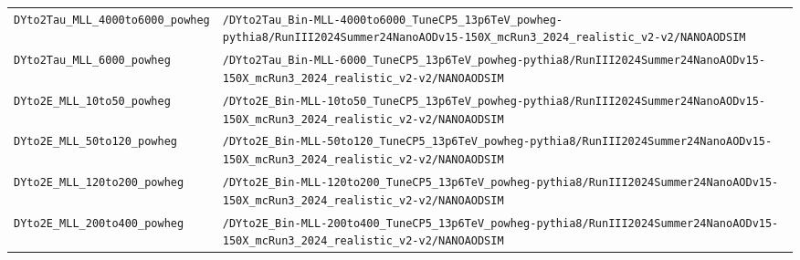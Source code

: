 \begin{longtable}{@{}>{\RaggedRight\arraybackslash}p{} >{\RaggedRight\arraybackslash}p{}@{}}
\addlinespace[2pt]
\texttt{DYto2Tau\_\allowbreak{}MLL\_\allowbreak{}4000to6000\_\allowbreak{}powheg} & \texttt{/\allowbreak{}DYto2Tau\_\allowbreak{}Bin-\allowbreak{}MLL-\allowbreak{}4000to6000\_\allowbreak{}TuneCP5\_\allowbreak{}13p6TeV\_\allowbreak{}powheg-\allowbreak{}pythia8/\allowbreak{}RunIII2024Summer24NanoAODv15-\allowbreak{}150X\_\allowbreak{}mcRun3\_\allowbreak{}2024\_\allowbreak{}realistic\_\allowbreak{}v2-\allowbreak{}v2/\allowbreak{}NANOAODSIM} \\
\addlinespace[2pt]
\texttt{DYto2Tau\_\allowbreak{}MLL\_\allowbreak{}6000\_\allowbreak{}powheg} & \texttt{/\allowbreak{}DYto2Tau\_\allowbreak{}Bin-\allowbreak{}MLL-\allowbreak{}6000\_\allowbreak{}TuneCP5\_\allowbreak{}13p6TeV\_\allowbreak{}powheg-\allowbreak{}pythia8/\allowbreak{}RunIII2024Summer24NanoAODv15-\allowbreak{}150X\_\allowbreak{}mcRun3\_\allowbreak{}2024\_\allowbreak{}realistic\_\allowbreak{}v2-\allowbreak{}v2/\allowbreak{}NANOAODSIM} \\
\addlinespace[2pt]
\texttt{DYto2E\_\allowbreak{}MLL\_\allowbreak{}10to50\_\allowbreak{}powheg} & \texttt{/\allowbreak{}DYto2E\_\allowbreak{}Bin-\allowbreak{}MLL-\allowbreak{}10to50\_\allowbreak{}TuneCP5\_\allowbreak{}13p6TeV\_\allowbreak{}powheg-\allowbreak{}pythia8/\allowbreak{}RunIII2024Summer24NanoAODv15-\allowbreak{}150X\_\allowbreak{}mcRun3\_\allowbreak{}2024\_\allowbreak{}realistic\_\allowbreak{}v2-\allowbreak{}v2/\allowbreak{}NANOAODSIM} \\
\addlinespace[2pt]
\texttt{DYto2E\_\allowbreak{}MLL\_\allowbreak{}50to120\_\allowbreak{}powheg} & \texttt{/\allowbreak{}DYto2E\_\allowbreak{}Bin-\allowbreak{}MLL-\allowbreak{}50to120\_\allowbreak{}TuneCP5\_\allowbreak{}13p6TeV\_\allowbreak{}powheg-\allowbreak{}pythia8/\allowbreak{}RunIII2024Summer24NanoAODv15-\allowbreak{}150X\_\allowbreak{}mcRun3\_\allowbreak{}2024\_\allowbreak{}realistic\_\allowbreak{}v2-\allowbreak{}v2/\allowbreak{}NANOAODSIM} \\
\addlinespace[2pt]
\texttt{DYto2E\_\allowbreak{}MLL\_\allowbreak{}120to200\_\allowbreak{}powheg} & \texttt{/\allowbreak{}DYto2E\_\allowbreak{}Bin-\allowbreak{}MLL-\allowbreak{}120to200\_\allowbreak{}TuneCP5\_\allowbreak{}13p6TeV\_\allowbreak{}powheg-\allowbreak{}pythia8/\allowbreak{}RunIII2024Summer24NanoAODv15-\allowbreak{}150X\_\allowbreak{}mcRun3\_\allowbreak{}2024\_\allowbreak{}realistic\_\allowbreak{}v2-\allowbreak{}v2/\allowbreak{}NANOAODSIM} \\
\addlinespace[2pt]
\texttt{DYto2E\_\allowbreak{}MLL\_\allowbreak{}200to400\_\allowbreak{}powheg} & \texttt{/\allowbreak{}DYto2E\_\allowbreak{}Bin-\allowbreak{}MLL-\allowbreak{}200to400\_\allowbreak{}TuneCP5\_\allowbreak{}13p6TeV\_\allowbreak{}powheg-\allowbreak{}pythia8/\allowbreak{}RunIII2024Summer24NanoAODv15-\allowbreak{}150X\_\allowbreak{}mcRun3\_\allowbreak{}2024\_\allowbreak{}realistic\_\allowbreak{}v2-\allowbreak{}v2/\allowbreak{}NANOAODSIM} \\

\end{longtable}
